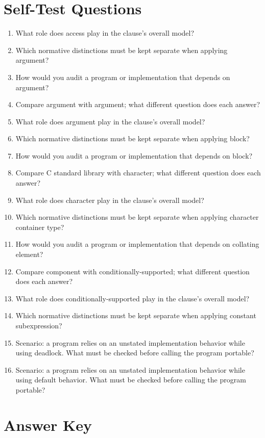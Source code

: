 \documentclass[11pt,letterpaper]{article}
\begin{document}
\section{Self-Test Questions}
\begin{enumerate}
\item What role does access play in the clause's overall model?
\item Which normative distinctions must be kept separate when applying argument?
\item How would you audit a program or implementation that depends on argument?
\item Compare argument with argument; what different question does each answer?
\item What role does argument play in the clause's overall model?
\item Which normative distinctions must be kept separate when applying block?
\item How would you audit a program or implementation that depends on block?
\item Compare C standard library with character; what different question does each answer?
\item What role does character play in the clause's overall model?
\item Which normative distinctions must be kept separate when applying character container type?
\item How would you audit a program or implementation that depends on collating element?
\item Compare component with conditionally-supported; what different question does each answer?
\item What role does conditionally-supported play in the clause's overall model?
\item Which normative distinctions must be kept separate when applying constant subexpression?
\item Scenario: a program relies on an unstated implementation behavior while using deadlock. What must be checked before calling the program portable?
\item Scenario: a program relies on an unstated implementation behavior while using default behavior. What must be checked before calling the program portable?
\end{enumerate}
\clearpage\section{Answer Key}
\end{document}
